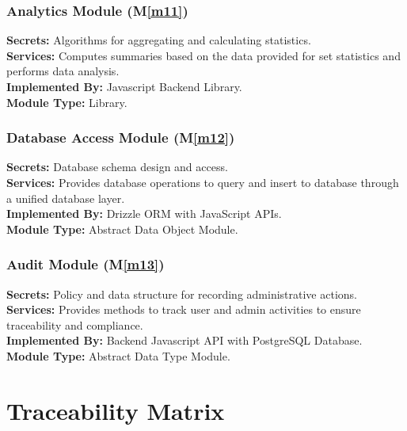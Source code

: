 \documentclass[12pt, titlepage]{article}
\newcommand{\mref}[1]{M\ref{#1}}
\begin{document}
\subsubsection{Analytics Module (\mref{m11})}
\textbf{Secrets:} Algorithms for aggregating and calculating statistics.\\
\textbf{Services:} Computes summaries based on the data provided for set statistics and performs data analysis.\\
\textbf{Implemented By:} Javascript Backend Library.\\
\textbf{Module Type:} Library.

\subsubsection{Database Access Module (\mref{m12})}
\textbf{Secrets:} Database schema design and access.\\
\textbf{Services:} Provides database operations to query and insert to database through a unified database layer.\\
\textbf{Implemented By:} Drizzle ORM with JavaScript APIs.\\
\textbf{Module Type:} Abstract Data Object Module.

\subsubsection{Audit Module (\mref{m13})}
\textbf{Secrets:} Policy and data structure for recording administrative actions.\\
\textbf{Services:} Provides methods to track user and admin activities to ensure traceability and compliance.\\
\textbf{Implemented By:} Backend Javascript API with PostgreSQL Database.\\
\textbf{Module Type:} Abstract Data Type Module.

\section{Traceability Matrix} \label{SecTM}
\end{document}
